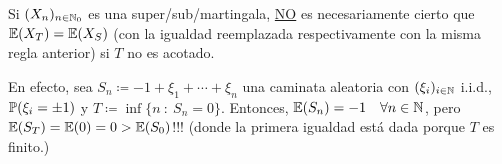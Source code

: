 \begin{remark}
	Si $(X_{n})_{n \in \mathbb{N}_{0}}$ es una super/sub/martingala, \underline{NO} es necesariamente cierto que $\mathbb{E}(X_{T}) = \mathbb{E}(X_{S})$ (con la igualdad reemplazada respectivamente con la misma regla anterior) si $T$ no es acotado. \par
	En efecto, sea $S_{n} \coloneq -1 + \xi_{1} + \cdots + \xi_{n}$ una caminata aleatoria con $(\xi_{i})_{i \in \mathbb{N}}$ i.i.d., $\mathbb{P}(\xi_{i} = \pm 1)$ y $T \coloneq \inf \{n \ : \ S_{n} = 0\}$. Entonces, $\mathbb{E}(S_{n}) = -1 \quad \forall n \in \mathbb{N}$, pero $\mathbb{E}(S_{T}) = \mathbb{E}(0) = 0 > \mathbb{E}(S_{0})$!!! (donde la primera igualdad está dada porque $T$ es finito.)
\end{remark}
